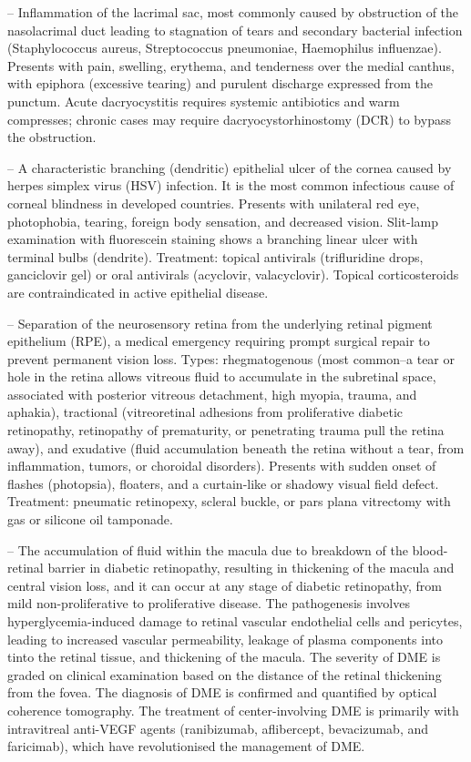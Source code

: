 -- Inflammation of the lacrimal sac, most commonly caused by obstruction of the nasolacrimal duct leading to stagnation of tears and secondary bacterial infection (Staphylococcus aureus, Streptococcus pneumoniae, Haemophilus influenzae). Presents with pain, swelling, erythema, and tenderness over the medial canthus, with epiphora (excessive tearing) and purulent discharge expressed from the punctum. Acute dacryocystitis requires systemic antibiotics and warm compresses; chronic cases may require dacryocystorhinostomy (DCR) to bypass the obstruction.

-- A characteristic branching (dendritic) epithelial ulcer of the cornea caused by herpes simplex virus (HSV) infection. It is the most common infectious cause of corneal blindness in developed countries. Presents with unilateral red eye, photophobia, tearing, foreign body sensation, and decreased vision. Slit-lamp examination with fluorescein staining shows a branching linear ulcer with terminal bulbs (dendrite). Treatment: topical antivirals (trifluridine drops, ganciclovir gel) or oral antivirals (acyclovir, valacyclovir). Topical corticosteroids are contraindicated in active epithelial disease.

-- Separation of the neurosensory retina from the underlying retinal pigment epithelium (RPE), a medical emergency requiring prompt surgical repair to prevent permanent vision loss. Types: rhegmatogenous (most common--a tear or hole in the retina allows vitreous fluid to accumulate in the subretinal space, associated with posterior vitreous detachment, high myopia, trauma, and aphakia), tractional (vitreoretinal adhesions from proliferative diabetic retinopathy, retinopathy of prematurity, or penetrating trauma pull the retina away), and exudative (fluid accumulation beneath the retina without a tear, from inflammation, tumors, or choroidal disorders). Presents with sudden onset of flashes (photopsia), floaters, and a curtain-like or shadowy visual field defect. Treatment: pneumatic retinopexy, scleral buckle, or pars plana vitrectomy with gas or silicone oil tamponade.

-- The accumulation of fluid within the macula due to breakdown of the blood-retinal barrier in diabetic retinopathy, resulting in thickening of the macula and central vision loss, and it can occur at any stage of diabetic retinopathy, from mild non-proliferative to proliferative disease. The pathogenesis involves hyperglycemia-induced damage to retinal vascular endothelial cells and pericytes, leading to increased vascular permeability, leakage of plasma components into tinto the retinal tissue, and thickening of the macula. The severity of DME is graded on clinical examination based on the distance of the retinal thickening from the fovea. The diagnosis of DME is confirmed and quantified by optical coherence tomography. The treatment of center-involving DME is primarily with intravitreal anti-VEGF agents (ranibizumab, aflibercept, bevacizumab, and faricimab), which have revolutionised the management of DME.

